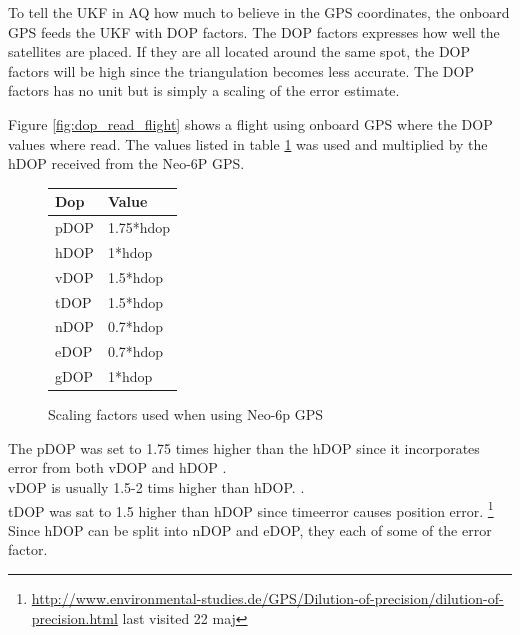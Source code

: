 To tell the UKF in AQ how much to believe in the GPS coordinates, the onboard GPS feeds the UKF with DOP factors. The DOP factors expresses how well the satellites are placed. If they are all located around the same spot, the DOP factors will be high since the triangulation becomes less accurate. The DOP factors has no unit but is simply a scaling of the error estimate. \cite{kelddueholmmikkellaurentziusannab.o.jensen2015}

\newpage
Figure \ref{fig:dop_read_flight} shows a flight using onboard GPS where the DOP values where read. The values listed in table \ref{tab:DOP} was used and multiplied by the hDOP received from the Neo-6P GPS. 
\begin{figure}
 \begin{center}
	\caption{Scaling factors used when using Neo-6p GPS}
	\label{tab:DOP}
	\begin{tabular}{@{}|l|l|@{}}
	\toprule
	Dop  & Value     \\ \midrule
	pDOP & 1.75*hdop \\ \midrule
	hDOP & 1*hdop    \\ \midrule
	vDOP & 1.5*hdop  \\ \midrule
	tDOP & 1.5*hdop  \\ \midrule
	nDOP & 0.7*hdop  \\ \midrule
	eDOP & 0.7*hdop  \\ \midrule
	gDOP & 1*hdop    \\ \bottomrule
	\end{tabular}
  \end{center}
\end{figure}

The pDOP was set to 1.75 times higher than the hDOP since it incorporates error from both vDOP and hDOP \cite{kelddueholmmikkellaurentziusannab.o.jensen2015}. \\
vDOP is usually 1.5-2 tims higher than hDOP.  \cite{kelddueholmmikkellaurentziusannab.o.jensen2015}. \\
tDOP was sat to 1.5 higher than hDOP since timeerror causes position error. \footnote{\url{http://www.environmental-studies.de/GPS/Dilution-of-precision/dilution-of-precision.html} last visited 22 maj} \\
Since hDOP can be split into nDOP and eDOP, they each of some of the error factor. \\
 \cite{kelddueholmmikkellaurentziusannab.o.jensen2015}




